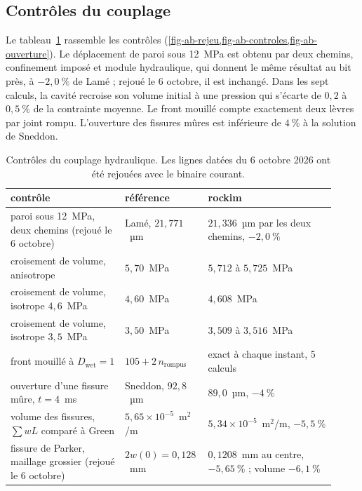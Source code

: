 \subsection{Contrôles du couplage}

Le tableau~\ref{tab-ab-controles} rassemble les contrôles (\cref{fig-ab-rejeu,fig-ab-controles,fig-ab-ouverture}). Le déplacement de paroi sous 12~MPa est obtenu par deux chemins, confinement imposé et module hydraulique, qui donnent le même résultat au bit près, à $-2{,}0~\%$ de Lamé ; rejoué le 6 octobre, il est inchangé. Dans les sept calculs, la cavité recroise son volume initial à une pression qui s'écarte de $0{,}2$ à $0{,}5~\%$ de la contrainte moyenne. Le front mouillé compte exactement deux lèvres par joint rompu. L'ouverture des fissures mûres est inférieure de $4~\%$ à la solution de Sneddon.

\begin{table}[htbp]
\centering
\caption{Contrôles du couplage hydraulique. Les lignes datées du 6 octobre 2026 ont été rejouées avec le binaire courant.}
\label{tab-ab-controles}
\small
\begin{tabular}{@{}p{0.34\linewidth}p{0.20\linewidth}p{0.38\linewidth}@{}}
\toprule
contrôle & référence & rockim \\
\midrule
paroi sous 12~MPa, deux chemins (rejoué le 6 octobre) & Lamé, $21{,}771$~µm & $21{,}336$~µm par les deux chemins, $-2{,}0~\%$ \\
croisement de volume, anisotrope & $5{,}70$~MPa & $5{,}712$ à $5{,}725$~MPa \\
croisement de volume, isotrope $4{,}6$~MPa & $4{,}60$~MPa & $4{,}608$~MPa \\
croisement de volume, isotrope $3{,}5$~MPa & $3{,}50$~MPa & $3{,}509$ à $3{,}516$~MPa \\
front mouillé à $D_\text{wet} = 1$ & $105 + 2\,n_\text{rompus}$ & exact à chaque instant, 5 calculs \\
ouverture d'une fissure mûre, $t = 4$~ms & Sneddon, $92{,}8$~µm & $89{,}0$~µm, $-4~\%$ \\
volume des fissures, $\sum w L$ comparé à Green & $5{,}65\times10^{-5}$~m$^2$/m & $5{,}34\times10^{-5}$~m$^2$/m, $-5{,}5~\%$ \\
fissure de Parker, maillage grossier (rejoué le 6 octobre) & $2w(0) = 0{,}128$~mm & $0{,}1208$~mm au centre, $-5{,}65~\%$ ; volume $-6{,}1~\%$ \\
\bottomrule
\end{tabular}
\end{table}

